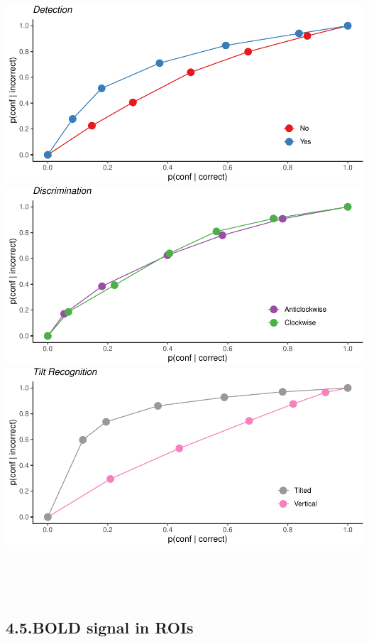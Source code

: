 \documentclass[]{article}
\begin{document}
\includegraphics{Chudi-Thesis_files/figure-latex/fig-1.pdf}
\includegraphics{Chudi-Thesis_files/figure-latex/fig-2.pdf}
\includegraphics{Chudi-Thesis_files/figure-latex/fig-3.pdf}

~

~

\hypertarget{bold-signal-in-rois}{%
\subsection{4.5.BOLD signal in ROIs}\label{bold-signal-in-rois}}
\end{document}
